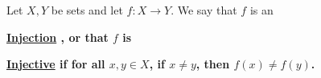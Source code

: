 \newcommand{\Injective}[0]{
    \bf \hyperref[def:Injective]{Injective} \rm
}
\newcommand{\Injectivity}[0]{
    \bf \hyperref[def:Injective]{Injectiveness} \rm
}
\newcommand{\Injection}[0]{
    \bf \hyperref[def:Injective]{Injection} \rm
}
\newcommand{\Injections}[0]{
    \bf \hyperref[def:Injective]{Injections} \rm
}\begin{df}[Injective]
\label{def:Injective}

\rm
    Let $X,Y$ be sets and let 
    $f:X \to Y$. 
    We say that $f$ is 
    an 
    \Injection, 
    or that $f$ is 
    \Injective if 
    for all $x,y \in X$, 
    if $x \neq y$, then 
    $f(x) \neq f(y)$. 
\end{df}
    
